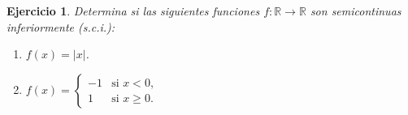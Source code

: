 \documentclass[11pt]{report}
\newtheorem{ex}{Ejercicio}
\begin{document}
\begin{ex}
  Determina si las siguientes funciones \( f: \mathbb{R} \to \mathbb{R} \) son semicontinuas inferiormente (s.c.i.):
  \begin{enumerate}
    \item \( f(x) = |x| \).
    \item \( f(x) = \begin{cases}
      -1 & \text{si } x < 0, \\
      1 & \text{si } x \geq 0.
    \end{cases} \)
  \end{enumerate}


\end{ex}
\end{document}
